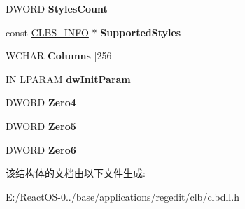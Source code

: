 \begin{DoxyCompactItemize}
D\+W\+O\+RD {\bfseries Styles\+Count}
\item 
\mbox{\label{struct___c_u_s_t_o_m___c_o_n_t_r_o_l___i_n_f_o_a8e2ef090baf4b4369a3c310d2a8c43dd}} 
const \hyperlink{struct___c_l_b_s___i_n_f_o}{C\+L\+B\+S\+\_\+\+I\+N\+FO} $\ast$ {\bfseries Supported\+Styles}
\item 
\mbox{\label{struct___c_u_s_t_o_m___c_o_n_t_r_o_l___i_n_f_o_a1f0c295296b65a3ca47b4b129d3e8162}} 
W\+C\+H\+AR {\bfseries Columns} \mbox{[}256\mbox{]}
\item 
\mbox{\label{struct___c_u_s_t_o_m___c_o_n_t_r_o_l___i_n_f_o_a5936401edef724655a7060e1ca75ca98}} 
IN L\+P\+A\+R\+AM {\bfseries dw\+Init\+Param}
\item 
\mbox{\label{struct___c_u_s_t_o_m___c_o_n_t_r_o_l___i_n_f_o_adf05a1ddc38e1c07fda671f536f656a5}} 
D\+W\+O\+RD {\bfseries Zero4}
\item 
\mbox{\label{struct___c_u_s_t_o_m___c_o_n_t_r_o_l___i_n_f_o_a0e75dda70b8a8f9d2c0b8203bfd5b3de}} 
D\+W\+O\+RD {\bfseries Zero5}
\item 
\mbox{\label{struct___c_u_s_t_o_m___c_o_n_t_r_o_l___i_n_f_o_a4f2986c3a55d2b1b022ecb6cb5b4afce}} 
D\+W\+O\+RD {\bfseries Zero6}
\end{DoxyCompactItemize}


该结构体的文档由以下文件生成\+:\begin{DoxyCompactItemize}
\item 
E\+:/\+React\+O\+S-\/0../base/applications/regedit/clb/clbdll.\+h\end{DoxyCompactItemize}
